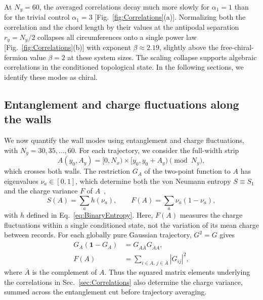 \documentclass[aps,prb,10pt,twocolumn,superscriptaddress,longbibliography,floatfix]{revtex4-2}
\newcommand{\newtext}[1]{{\color{blue}#1}}
\begin{document}
\newtext{At $N_y=60$, the averaged correlations decay much more slowly for $\alpha_1=1$ than for the trivial control $\alpha_1=3$ [Fig.~\ref{fig:Correlations}(a)].} \newtext{Normalizing both the correlation and the chord length by their values at the antipodal separation $r_y=N_y/2$ collapses all circumferences onto a single power law [Fig.~\ref{fig:Correlations}(b)] with exponent $\beta\approx2.19$, slightly above the free-chiral-fermion value $\beta=2$ at these system sizes.} \newtext{The scaling collapse supports algebraic correlations in the conditioned topological state.} In the following sections, we identify these modes as chiral.

\subsection{Entanglement and charge fluctuations along the walls}
\label{sec:Entanglement}

{\color{blue}
We now quantify the wall modes using entanglement and charge fluctuations, with $N_y=30,35,\ldots,60$. For each trajectory, we consider the full-width strip
\begin{equation}
    A(y_0,A_y)=[0,N_x)\times[y_0,y_0+A_y)\pmod{N_y},
    \label{eq:Strip}
\end{equation}
which crosses both walls. The restriction $G_A$ of the two-point function to $A$ has eigenvalues $\nu_a\in[0,1]$, which determine both the von Neumann entropy $S\equiv S_1$ and the charge variance $F$ of $A$~\cite{KlichLevitov2009,SongFlindtRachel2011},
\begin{equation}
    S(A)=\sum_a h(\nu_a),
    \qquad
    F(A)=\sum_a\nu_a(1-\nu_a),
    \label{eq:EntropyVariance}
\end{equation}
\newtext{with $h$ defined in Eq.~\eqref{eq:BinaryEntropy}.}
Here, $F(A)$ measures the charge fluctuations within a single conditioned state, not the variation of its mean charge between records. For each globally pure Gaussian trajectory, $G^2=G$ gives
\begin{align}
 G_A(\mathbf{1}-G_A)&=G_{A\bar A}G_{\bar A A},\nonumber\\
 F(A)&=\sum_{i\in A,\,j\in\bar A}|G_{ij}|^2,
 \label{eq:VarianceCrossCut}
\end{align}
where $\bar A$ is the complement of $A$. Thus the squared matrix elements underlying the correlations in Sec.~\ref{sec:Correlations} also determine the charge variance, summed across the entanglement cut before trajectory averaging.
}
\end{document}
